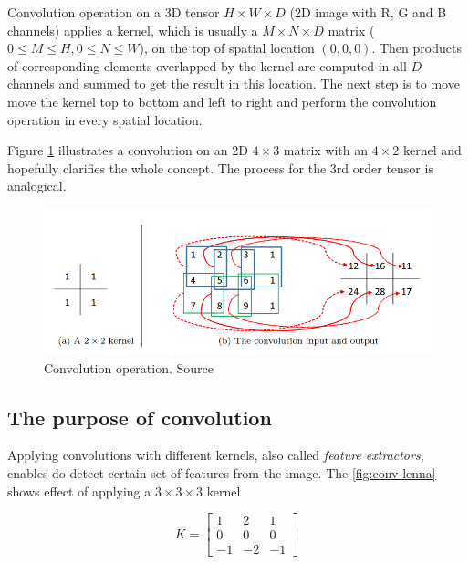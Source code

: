 Convolution operation on a 3D tensor $H \times W \times D$ (2D image with R, G and B channels) applies a kernel, which is usually a $M \times N \times D$ matrix 
($0 \leq M \leq H, 0 \leq N \leq W$), on the top of spatial location $(0, 0, 0)$. Then products of corresponding elements overlapped by the kernel are computed in all $D$ channels and summed to get the result in this location. The next step is to move move the kernel top to bottom and left to right and perform the convolution operation in every spatial location.

Figure \ref{fig:conv-example} illustrates a convolution on an 2D $4 \times 3$ matrix with an $4 \times 2$ kernel and hopefully clarifies the whole concept. The process for the 3rd order tensor is analogical.

\begin{figure}[h]
    \centering
    \includegraphics[width=14cm]{img/ConvExample.png}
    \caption{Convolution operation. Source \cite{Wu2017IntroductionTC}}
    \label{fig:conv-example}
\end{figure}

\subsection{The purpose of convolution}
\label{sub:purpose-of-convolution}

Applying convolutions with different kernels, also called \emph{feature extractors}, enables do detect certain set of features from the image. The \ref{fig:conv-lenna} shows effect of applying a $3 \times 3 \times 3$ kernel

\begin{equation}
    K = \begin{bmatrix}
            1 & 2 & 1 \\
            0 & 0 & 0 \\
            -1 & -2 & -1
        \end{bmatrix}
\end{equation}

